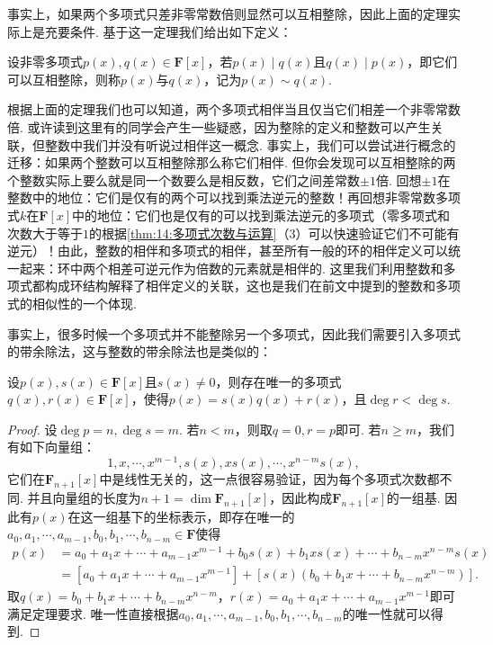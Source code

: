 事实上，如果两个多项式只差非零常数倍则显然可以互相整除，因此上面的定理实际上是充要条件. 基于这一定理我们给出如下定义：
\begin{definition}
    设非零多项式$p(x),q(x)\in\mathbf{F}[x]$，若$p(x)\mid q(x)$且$q(x)\mid p(x)$，即它们可以互相整除，则称$p(x)$与$q(x)$，记为$p(x)\sim q(x)$.
\end{definition}

根据上面的定理我们也可以知道，两个多项式相伴当且仅当它们相差一个非零常数倍. 或许读到这里有的同学会产生一些疑惑，因为整除的定义和整数可以产生关联，但整数中我们并没有听说过相伴这一概念. 事实上，我们可以尝试进行概念的迁移：如果两个整数可以互相整除那么称它们相伴. 但你会发现可以互相整除的两个整数实际上要么就是同一个数要么是相反数，它们之间差常数$\pm 1$倍. 回想$\pm 1$在整数中的地位：它们是仅有的两个可以找到乘法逆元的整数！再回想非零常数多项式$k$在$\mathbf{F}[x]$中的地位：它们也是仅有的可以找到乘法逆元的多项式（零多项式和次数大于等于$1$的根据\autoref{thm:14:多项式次数与运算}（3）可以快速验证它们不可能有逆元）！由此，整数的相伴和多项式的相伴，甚至所有一般的环的相伴定义可以统一起来：环中两个相差可逆元作为倍数的元素就是相伴的. 这里我们利用整数和多项式都构成环结构解释了相伴定义的关联，这也是我们在前文中提到的整数和多项式的相似性的一个体现.

事实上，很多时候一个多项式并不能整除另一个多项式，因此我们需要引入多项式的带余除法，这与整数的带余除法也是类似的：
\begin{theorem} \label{thm:14:带余除法}
    设$p(x),s(x)\in\mathbf{F}[x]$且$s(x)\neq 0$，则存在唯一的多项式$q(x),r(x)\in\mathbf{F}[x]$，使得$p(x)=s(x)q(x)+r(x)$，且$\deg r<\deg s$.
\end{theorem}
\begin{proof}
    设$\deg p=n,\deg s=m$. 若$n<m$，则取$q=0,r=p$即可. 若$n\geqslant m$，我们有如下向量组：
    \[1,x,\cdots,x^{m-1},s(x),xs(x),\cdots,x^{n-m}s(x),\]
    它们在$\mathbf{F}_{n+1}[x]$中是线性无关的，这一点很容易验证，因为每个多项式次数都不同. 并且向量组的长度为$n+1=\dim\mathbf{F}_{n+1}[x]$，因此构成$\mathbf{F}_{n+1}[x]$的一组基. 因此有$p(x)$在这一组基下的坐标表示，即存在唯一的$a_0,a_1,\cdots,a_{m-1},b_0,b_1,\cdots,b_{n-m}\in\mathbf{F}$使得
    \begin{align*}
        p(x)&=a_0+a_1x+\cdots+a_{m-1}x^{m-1}+b_0s(x)+b_1xs(x)+\cdots+b_{n-m}x^{n-m}s(x)\\
            &=[a_0+a_1x+\cdots+a_{m-1}x^{m-1}]+[s(x)(b_0+b_1x+\cdots+b_{n-m}x^{n-m})].
    \end{align*}
    取$q(x)=b_0+b_1x+\cdots+b_{n-m}x^{n-m}$，$r(x)=a_0+a_1x+\cdots+a_{m-1}x^{m-1}$即可满足定理要求. 唯一性直接根据$a_0,a_1,\cdots,a_{m-1},b_0,b_1,\cdots,b_{n-m}$的唯一性就可以得到.
\end{proof}

